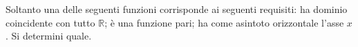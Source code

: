 Soltanto una delle seguenti funzioni corrisponde ai seguenti requisiti:
ha dominio coincidente con tutto $\mathbb{R}$; è una funzione pari;
ha come asintoto orizzontale l’asse $x$.
Si determini quale.
